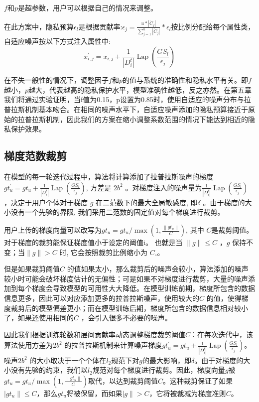 $f$和$p$是超参数，用户可以根据自己的情况来调整。

在此方案中，隐私预算$\epsilon_{l}$是根据贡献率:$\epsilon_{j}=\frac{u *\left|\ddot{C}_{j}\right|}{\sum_{j=1}^{u}\left|\ddot{C}_{j}\right|} * \epsilon_{l}$按比例分配给每个属性类，自适应噪声按以下方式注入属性中:
\begin{equation}\label{eq:神经网络加噪3}
x_{i, j}^{\prime}=x_{i, j}+\frac{1}{\left|D_{i}^{t}\right|} \operatorname{Lap}\left(\frac{G S_{l}}{\epsilon_{j}}\right)
\end{equation}

在不失一般性的情况下，调整因子$f$和$p$的值与系统的准确性和隐私水平有关。即$f$越小，$p$越大，代表越高的隐私保护水平，模型准确性越低，反之亦然。在第五章我们将通过实验证明，当f值为0.15，p设置为0.85时，使用自适应的噪声分布与拉普拉斯机制基本吻合。在相同的噪声水平下，自适应噪声添加的隐私预算接近于原始的拉普拉斯机制，因此我们的方案在缩小调整系数范围的情况下能达到相近的隐私保护效果。

\subsection{梯度范数裁剪}
在模型的每一轮迭代过程中，算法将计算添加了拉普拉斯噪声的梯度$g t_{u}^{\prime}=g t_{u}+\frac{1}{\left|D_{i}^{t}\right|} \operatorname{Lap}\left(\frac{G S_{l}}{\epsilon_{j}}\right)$, 方差是 $2 b^{2}$ 。对梯度注入的噪声量为$\frac{1}{\left|D_{i}^{t}\right|} \operatorname{Lap}\left(\frac{G S_{l}}{\epsilon_{j}}\right)$，决定于用户个体对于梯度 $g$ 在二范数下的最大全局敏感度, 即$\delta$ 。由于梯度的大小没有一个先验的界限, 我们采用二范数的固定值对每个梯度进行裁剪。

用户上传的梯度向量可以改写为$g t_{u}=g t_{u} / \max \left(1, \frac{\left\|g t_{u}\right\|}{C}\right)$, 其中 $C$是裁剪阈值。对于梯度的裁剪能保证梯度值小于设定的阈值$\mathrm{i}$。 也就是当 $\|g\| \leq C$ ，$g$ 保持不变；当$\|g\|>C$ 时, 它会按照裁剪比例缩小为 $C_{\circ}$。

但是如果裁剪阈值$C$ 的值如果太小，那么裁剪后的噪声会较小，算法添加的噪声较小时可能会破坏梯度估计的无偏性；可是如果不对梯度进行裁剪，大量的噪声添加到每个梯度会导致模型的可用性大大降低。在模型训练前期，梯度所包含的数据信息更多，因此可以对应添加更多的拉普拉斯噪声，使用较大的$C$ 的值，使得梯度裁剪后的模型偏差更小；而在模型训练后期，梯度所包含的数据信息相对较小了，如果还使用相同的$C$ ，会引入很多不必要的噪声。

因此我们根据训练轮数和层间贡献率动态调整梯度裁剪阈值$C$：在每次迭代中，该算法使用方差为$2 b^{2}$ 的拉普拉斯机制来计算噪声梯度$g t_{u}^{\prime}=g t_{u}+\frac{1}{\left|D_{i}^{t}\right|} \operatorname{Lap}\left(\frac{G S_{l}}{\epsilon_{j}}\right)$。噪声$2 b^{2}$ 的大小取决于一个个体在$l_{2}$规范下对$g$的最大影响，即$\delta$。由于对梯度的大小没有先验的约束，我们以$l_{2}$规范对每个梯度进行裁剪。因此，梯度向量$g$被$g t_{u}=g t_{u} / \max \left(1, \frac{\left\|g t_{u}\right\|}{C}\right)$取代，以达到裁剪阈值$C$。这种裁剪保证了如果$|g t_{u}\| \leq C$，那么$g t_{u}$将被保留，而如果$|g\|>C$，它将被裁减为梯度准则$C$。

